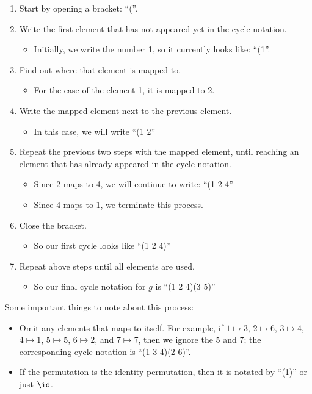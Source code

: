 \begin{enumerate}
    \item Start by opening a bracket: ``(''.
    \item Write the first element that has not appeared yet in the cycle notation.
    \begin{itemize}
        \item Initially, we write the number 1, so it currently looks like: ``(1''.
    \end{itemize}
    \item Find out where that element is mapped to.
    \begin{itemize}
        \item For the case of the element 1, it is mapped to 2.
    \end{itemize}
    \item Write the mapped element next to the previous element.
    \begin{itemize}
        \item In this case, we will write ``(1 2''
    \end{itemize}
    \item Repeat the previous two steps with the mapped element, until reaching an element that has already appeared in the cycle notation.
    \begin{itemize}
        \item Since 2 maps to 4, we will continue to write: ``(1 2 4''
        \item Since 4 maps to 1, we terminate this process.
    \end{itemize}
    \item Close the bracket.
    \begin{itemize}
        \item So our first cycle looks like ``(1 2 4)''
    \end{itemize}
    \item Repeat above steps until all elements are used.
    \begin{itemize}
        \item So our final cycle notation for $g$ is ``(1 2 4)(3 5)''
    \end{itemize}
\end{enumerate}

Some important things to note about this process:
\begin{itemize}
    \item Omit any elements that maps to itself. For example, if $1 \mapsto 3$, $2 \mapsto 6$, $3 \mapsto 4$, $4 \mapsto 1$, $5 \mapsto 5$, $6 \mapsto 2$, and $7 \mapsto 7$, then we ignore the 5 and 7; the corresponding cycle notation is ``(1 3 4)(2 6)''.
    \item If the permutation is the identity permutation, then it is notated by ``(1)'' or just $\id$.
\end{itemize}

